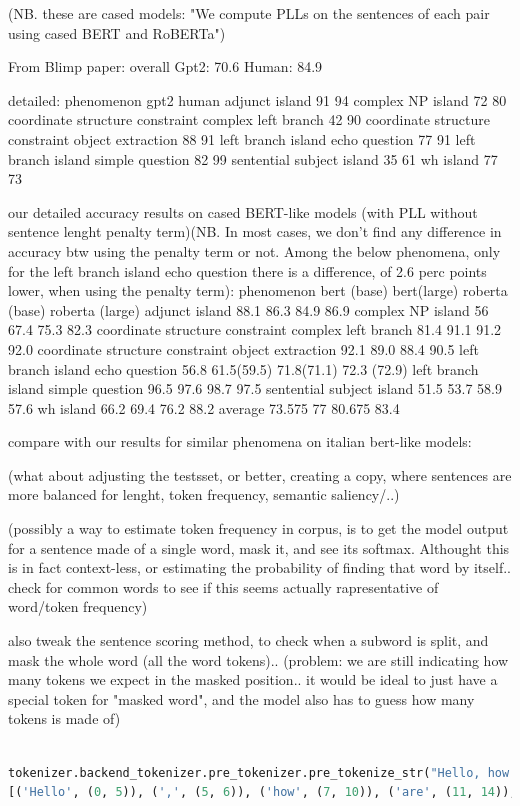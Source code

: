 (NB. these are cased models: "We compute PLLs on the sentences of each pair using cased BERT and RoBERTa")

From Blimp paper:
overall
Gpt2: 70.6
Human: 84.9

detailed:
phenomenon											gpt2	human
adjunct island 										91		94
complex NP island									72		80
coordinate structure constraint complex left branch	42		90
coordinate structure constraint object extraction 	88		91
left branch island echo question 					77 		91 
left branch island simple question 					82 		99 
sentential subject island 							35 		61 
wh island											77		73

our detailed accuracy results on cased BERT-like models (with PLL without sentence lenght penalty term)(NB. In most cases, we don't find any difference in accuracy btw using the penalty term or not. Among the below phenomena, only for the left branch island echo question there is a difference, of 2.6 perc points lower, when using the penalty term):
phenomenon											bert (base)	bert(large)	roberta (base) 	roberta (large)
adjunct island 										88.1		86.3		84.9			86.9		
complex NP island									56			67.4		75.3			82.3
coordinate structure constraint complex left branch	81.4		91.1		91.2			92.0
coordinate structure constraint object extraction 	92.1		89.0		88.4			90.5
left branch island echo question 				 	56.8 		61.5(59.5)	71.8(71.1)		72.3 (72.9)
left branch island simple question 					96.5		97.6		98.7			97.5
sentential subject island 							51.5		53.7		58.9			57.6
wh island											66.2		69.4		76.2			88.2
average												73.575		77			80.675			83.4

compare with our results for similar phenomena on italian bert-like models:


(what about adjusting the testsset, or better, creating a copy, where sentences are more balanced for lenght, token frequency, semantic saliency/..)

(possibly a way to estimate token frequency in corpus, is to get the model output for a sentence made of a single word, mask it, and see its softmax. Althought this is in fact context-less, or estimating the probability of finding that word by itself.. check for common words to see if this seems actually rapresentative of word/token frequency)

also tweak the sentence scoring method, to check when a subword is split, and mask the whole word (all the word tokens)..
(problem: we are still indicating how many tokens we expect in the masked position.. it would be ideal to just have a special token for "masked word", and the model also has to guess how many tokens is made of)
\begin{lstlisting}[language=Python]

tokenizer.backend_tokenizer.pre_tokenizer.pre_tokenize_str("Hello, how are  you?")
[('Hello', (0, 5)), (',', (5, 6)), ('how', (7, 10)), ('are', (11, 14)), ('you', (16, 19)), ('?', (19, 20))]
\end{lstlisting}

